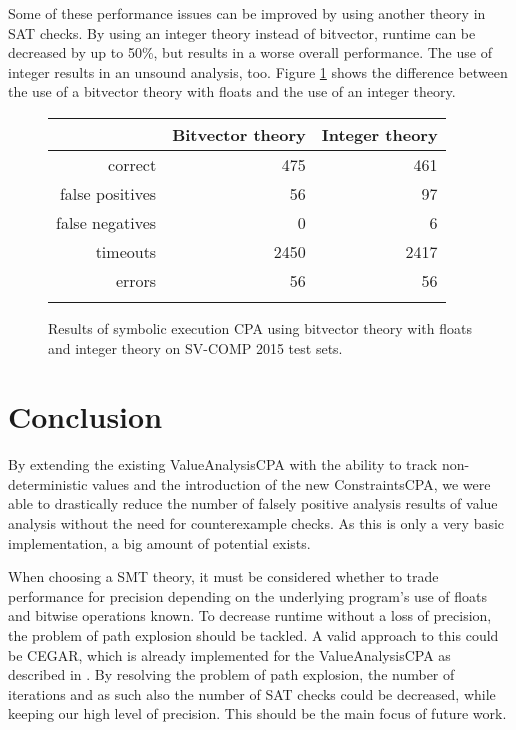 Some of these performance issues can be improved by using another theory in SAT checks.
By using an integer theory instead of bitvector, runtime can be decreased by up to 50\%, but results in a worse overall performance.
The use of integer results in an unsound analysis, too. Figure \ref{bitvecIntComp} shows the difference between the use of a bitvector theory with floats and the use of an integer theory.
\begin{figure}
\begin{tabular}{| r || r | r |}
\hline
& Bitvector theory & Integer theory \\ \hline
correct         &  475 &  461 \\ \hline
false positives &   56 &   97 \\ \hline
false negatives &    0 &    6 \\ \hline
timeouts        & 2450 & 2417 \\ \hline
errors          &   56 &   56 \\ \hline
                & & \\ \hline
\end{tabular}
\caption{Results of symbolic execution CPA using bitvector theory with floats and integer theory on SV-COMP 2015 test sets.}
\label{bitvecIntComp}
\end{figure}

\section{Conclusion}
By extending the existing ValueAnalysisCPA with the ability to track non-deterministic values and the introduction of the new ConstraintsCPA,
we were able to drastically reduce the number of falsely positive analysis results of value analysis without the need for counterexample checks.
As this is only a very basic implementation, a big amount of potential exists.

When choosing a SMT theory,
it must be considered whether to trade performance for precision depending on the underlying program's use of floats and bitwise operations known.
To decrease runtime without a loss of precision, the problem of path explosion should be tackled.
A valid approach to this could be CEGAR, which is already implemented for the ValueAnalysisCPA as described in \cite{Beyer2012}.
By resolving the problem of path explosion, the number of iterations and as such also the number of SAT checks could be decreased, while keeping our high level of precision.
This should be the main focus of future work.
